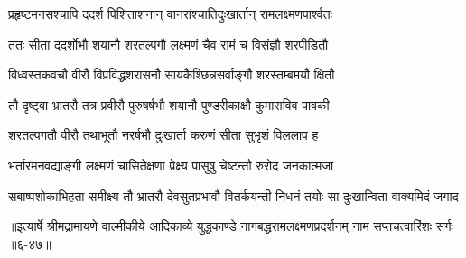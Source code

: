 \twolineshloka
{प्रहृष्टमनसश्चापि ददर्श पिशिताशनान्}
{वानरांश्चातिदुःखार्तान् रामलक्ष्मणपार्श्वतः} %

\twolineshloka
{ततः सीता ददर्शोभौ शयानौ शरतल्पगौ}
{लक्ष्मणं चैव रामं च विसंज्ञौ शरपीडितौ} %

\twolineshloka
{विध्वस्तकवचौ वीरौ विप्रविद्धशरासनौ}
{सायकैश्छिन्नसर्वाङ्गौ शरस्तम्बमयौ क्षितौ} %

\twolineshloka
{तौ दृष्ट्वा भ्रातरौ तत्र प्रवीरौ पुरुषर्षभौ}
{शयानौ पुण्डरीकाक्षौ कुमाराविव पावकी} %

\twolineshloka
{शरतल्पगतौ वीरौ तथाभूतौ नरर्षभौ}
{दुःखार्ता करुणं सीता सुभृशं विललाप ह} %

\twolineshloka
{भर्तारमनवद्याङ्गी लक्ष्मणं चासितेक्षणा}
{प्रेक्ष्य पांसुषु चेष्टन्तौ रुरोद जनकात्मजा} %

\twolineshloka
{सबाष्पशोकाभिहता समीक्ष्य तौ भ्रातरौ देवसुतप्रभावौ}
{वितर्कयन्ती निधनं तयोः सा दुःखान्विता वाक्यमिदं जगाद} %


॥इत्यार्षे श्रीमद्रामायणे वाल्मीकीये आदिकाव्ये युद्धकाण्डे नागबद्धरामलक्ष्मणप्रदर्शनम् नाम सप्तचत्वारिंशः सर्गः ॥६-४७॥
